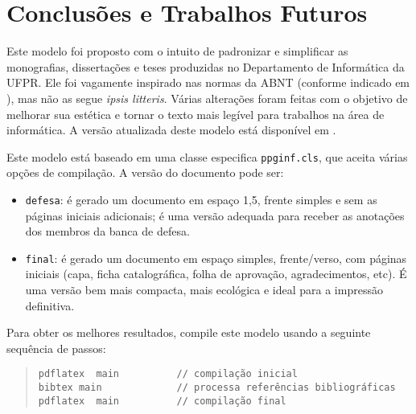 \chapter{Conclusões e Trabalhos Futuros}



Este modelo foi proposto com o intuito de padronizar e simplificar as monografias, dissertações e teses produzidas no Departamento de Informática da UFPR. Ele foi vagamente inspirado nas normas da ABNT (conforme indicado em \cite{bibufpr15}), mas não as segue \emph{ipsis litteris}. Várias alterações foram feitas com o objetivo de melhorar sua estética e tornar o texto mais legível para trabalhos na área de informática. A versão atualizada deste modelo está disponível em \cite{maziero15}.

Este modelo está baseado em uma classe especifica \verb#ppginf.cls#, que aceita várias opções de compilação. A versão do documento pode ser:

\begin{itemize}

\item \verb#defesa#: é gerado um documento em espaço 1,5, frente simples e sem as páginas iniciais adicionais; é uma versão adequada para receber as anotações dos membros da banca de defesa.

\item \verb#final#: é gerado um documento em espaço simples, frente/verso, com páginas iniciais (capa, ficha catalográfica, folha de aprovação, agradecimentos, etc). É uma versão bem mais compacta, mais ecológica e ideal para a impressão definitiva.

\end{itemize}

Para obter os melhores resultados, compile este modelo usando a seguinte sequência de passos:

\begin{quote}
\begin{footnotesize}
\begin{verbatim}
pdflatex  main          // compilação inicial
bibtex main             // processa referências bibliográficas
pdflatex  main          // compilação final
\end{verbatim}
\end{footnotesize}
\end{quote}

